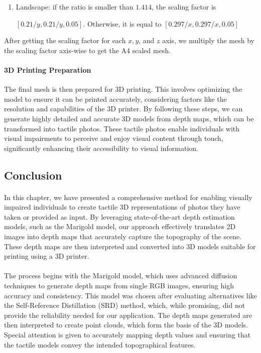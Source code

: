 \documentclass[12pt, letterpaper]{article}
\begin{document}
\begin{spacing}{1.15}
\begin{enumerate}
    \item Landscape: if the ratio is smaller than $1.414$, the scaling factor is

    \([0.21/y, 0.21/y, 0.05]\). Otherwise, it is equal to $[0.297/x, 0.297/x, 0.05]$
\end{enumerate}

After getting the scaling factor for each $x, y$, and $z$ axis, we multiply the mesh by the scaling factor axis-wise to get the A4 scaled mesh.

\paragraph{3D Printing Preparation} The final mesh is then prepared for 3D printing. This involves optimizing the model to ensure it can be printed accurately, considering factors like
the resolution and capabilities of the 3D printer. By following these steps, we can generate highly detailed and accurate 3D models from depth maps, which can be transformed into
tactile photos. These tactile photos enable individuals with visual impairments to perceive and enjoy visual content through touch, significantly enhancing their accessibility to visual
information.

\subsection{Conclusion}

\paragraph{}
In this chapter, we have presented a comprehensive method for enabling visually impaired individuals to create tactile 3D representations of photos they have taken or provided as input.
By leveraging state-of-the-art depth estimation models, such as the Marigold model, our approach effectively translates 2D images into depth maps that accurately capture the topography of
the scene. These depth maps are then interpreted and converted into 3D models suitable for printing using a 3D printer.
\paragraph{}
The process begins with the Marigold model, which uses advanced diffusion techniques to generate depth maps from single RGB images, ensuring high accuracy and consistency. This model was
chosen after evaluating alternatives like the Self-Reference Distillation (SRD) method, which, while promising, did not provide the reliability needed for our application. The depth maps
generated are then interpreted to create point clouds, which form the basis of the 3D models. Special attention is given to accurately mapping depth values and ensuring that the tactile
models convey the intended topographical features.

\end{spacing}
\end{document}
